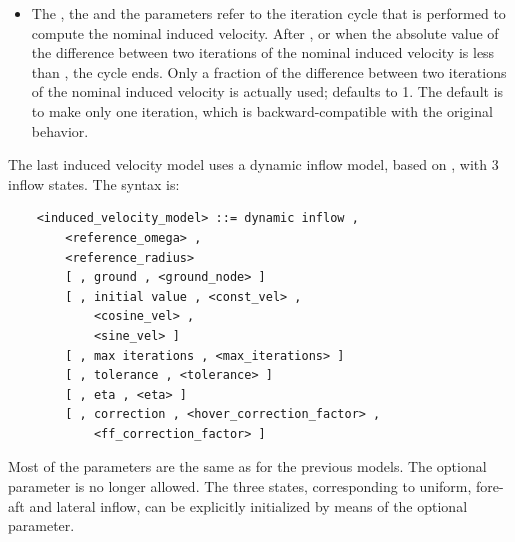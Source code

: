 \begin{itemize}
\item
The , the  
and the  parameters refer to the iteration cycle 
that is performed to compute the nominal induced velocity.
After , or when the absolute value 
of the difference between two iterations of the nominal induced 
velocity is less than , the cycle ends.
Only a fraction  of the difference between two
iterations of the nominal induced velocity is actually
used;  defaults to 1.
The default is to make only one iteration, which is backward-compatible
with the original behavior.

\end{itemize}

The last induced velocity model uses a dynamic inflow model,
based on \cite{PITT}, with 3 inflow states.
The syntax is:
\begin{verbatim}
    <induced_velocity_model> ::= dynamic inflow , 
        <reference_omega> , 
        <reference_radius> 
        [ , ground , <ground_node> ]
        [ , initial value , <const_vel> ,
            <cosine_vel> ,
            <sine_vel> ]
        [ , max iterations , <max_iterations> ]
        [ , tolerance , <tolerance> ]
        [ , eta , <eta> ]
        [ , correction , <hover_correction_factor> ,
            <ff_correction_factor> ]
\end{verbatim}
Most of the parameters are the same as for the previous models.
The optional  parameter is no longer allowed.
The three states, corresponding to uniform, fore-aft and lateral inflow,
can be explicitly initialized by means of the optional 
 parameter.

